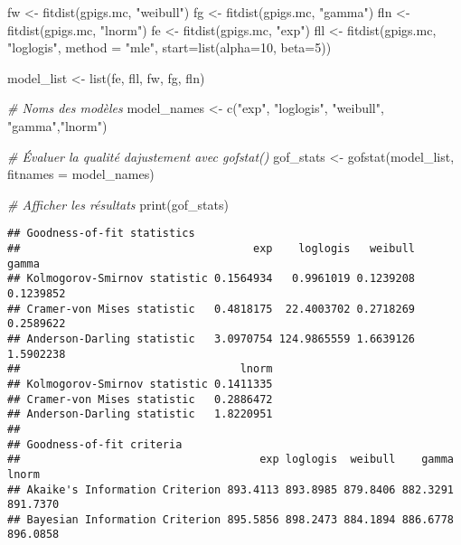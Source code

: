 \documentclass[
]{article}
\newenvironment{Shaded}{\begin{snugshade}}{\end{snugshade}}
\newcommand{\AttributeTok}[1]{\textcolor[rgb]{0.77,0.63,0.00}{#1}}
\newcommand{\CommentTok}[1]{\textcolor[rgb]{0.56,0.35,0.01}{\textit{#1}}}
\newcommand{\DecValTok}[1]{\textcolor[rgb]{0.00,0.00,0.81}{#1}}
\newcommand{\FunctionTok}[1]{\textcolor[rgb]{0.00,0.00,0.00}{#1}}
\newcommand{\NormalTok}[1]{#1}
\newcommand{\OtherTok}[1]{\textcolor[rgb]{0.56,0.35,0.01}{#1}}
\newcommand{\StringTok}[1]{\textcolor[rgb]{0.31,0.60,0.02}{#1}}
\begin{document}
\begin{Shaded}
\begin{Highlighting}[]
\NormalTok{fw }\OtherTok{\textless{}{-}} \FunctionTok{fitdist}\NormalTok{(gpigs.mc, }\StringTok{"weibull"}\NormalTok{)}
\NormalTok{fg }\OtherTok{\textless{}{-}} \FunctionTok{fitdist}\NormalTok{(gpigs.mc, }\StringTok{"gamma"}\NormalTok{) }
\NormalTok{fln }\OtherTok{\textless{}{-}} \FunctionTok{fitdist}\NormalTok{(gpigs.mc, }\StringTok{"lnorm"}\NormalTok{) }
\NormalTok{fe }\OtherTok{\textless{}{-}} \FunctionTok{fitdist}\NormalTok{(gpigs.mc, }\StringTok{"exp"}\NormalTok{) }
\NormalTok{fll }\OtherTok{\textless{}{-}} \FunctionTok{fitdist}\NormalTok{(gpigs.mc, }\StringTok{"loglogis"}\NormalTok{, }\AttributeTok{method =} \StringTok{"mle"}\NormalTok{, }\AttributeTok{start=}\FunctionTok{list}\NormalTok{(}\AttributeTok{alpha=}\DecValTok{10}\NormalTok{, }\AttributeTok{beta=}\DecValTok{5}\NormalTok{))}

\NormalTok{model\_list }\OtherTok{\textless{}{-}} \FunctionTok{list}\NormalTok{(fe, fll, fw, fg, fln)}

\CommentTok{\# Noms des modèles}
\NormalTok{model\_names }\OtherTok{\textless{}{-}} \FunctionTok{c}\NormalTok{(}\StringTok{"exp"}\NormalTok{, }\StringTok{"loglogis"}\NormalTok{, }\StringTok{"weibull"}\NormalTok{, }\StringTok{"gamma"}\NormalTok{,}\StringTok{"lnorm"}\NormalTok{)}

\CommentTok{\# Évaluer la qualité d\textquotesingle{}ajustement avec gofstat()}
\NormalTok{gof\_stats }\OtherTok{\textless{}{-}} \FunctionTok{gofstat}\NormalTok{(model\_list, }\AttributeTok{fitnames =}\NormalTok{ model\_names)}

\CommentTok{\# Afficher les résultats}
\FunctionTok{print}\NormalTok{(gof\_stats)}
\end{Highlighting}
\end{Shaded}

\begin{verbatim}
## Goodness-of-fit statistics
##                                    exp    loglogis   weibull     gamma
## Kolmogorov-Smirnov statistic 0.1564934   0.9961019 0.1239208 0.1239852
## Cramer-von Mises statistic   0.4818175  22.4003702 0.2718269 0.2589622
## Anderson-Darling statistic   3.0970754 124.9865559 1.6639126 1.5902238
##                                  lnorm
## Kolmogorov-Smirnov statistic 0.1411335
## Cramer-von Mises statistic   0.2886472
## Anderson-Darling statistic   1.8220951
## 
## Goodness-of-fit criteria
##                                     exp loglogis  weibull    gamma    lnorm
## Akaike's Information Criterion 893.4113 893.8985 879.8406 882.3291 891.7370
## Bayesian Information Criterion 895.5856 898.2473 884.1894 886.6778 896.0858
\end{verbatim}
\end{document}
